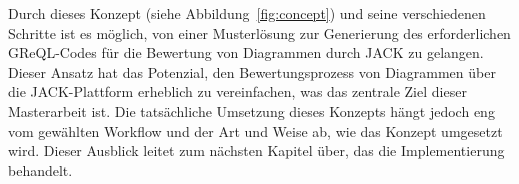 Durch dieses Konzept (siehe Abbildung~\ref{fig:concept}) und seine verschiedenen Schritte ist es möglich, von einer Musterlösung zur Generierung des erforderlichen GReQL-Codes für die Bewertung von Diagrammen durch JACK zu gelangen. Dieser Ansatz hat das Potenzial, den Bewertungsprozess von Diagrammen über die JACK-Plattform erheblich zu vereinfachen, was das zentrale Ziel dieser Masterarbeit ist. Die tatsächliche Umsetzung dieses Konzepts hängt jedoch eng vom gewählten Workflow und der Art und Weise ab, wie das Konzept umgesetzt wird. Dieser Ausblick leitet zum nächsten Kapitel über, das die Implementierung behandelt.